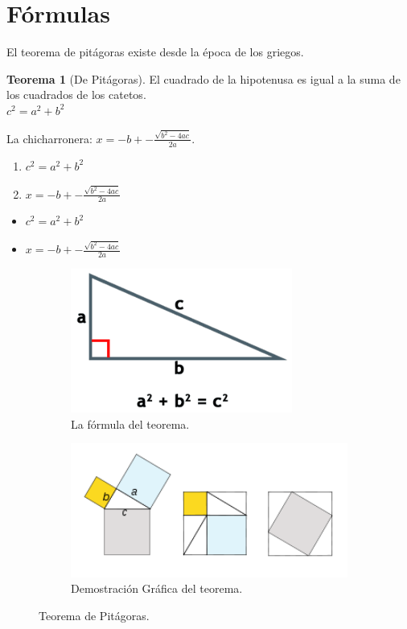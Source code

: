 \documentclass[oneside]{book}
\theoremstyle{definition}
\newtheorem{teorema}{Teorema}[chapter] %
\begin{document}
\section{Fórmulas}
El teorema de pitágoras existe desde la época de los griegos.

\begin{teorema}[De Pitágoras]
El cuadrado de la hipotenusa es igual a la suma de los cuadrados de los catetos.\\
$c^2 = a^2+b^2$
\end{teorema}

La chicharronera: $x= -b +-\frac{\sqrt{b^2-4ac}}{2a}$.

\begin{enumerate}
\item $c^2=a^2+b^2$
\item $x= -b +-\frac{\sqrt{b^2-4ac}}{2a}$
\end{enumerate}

\begin{itemize}
\item $c^2=a^2+b^2$
\item $x= -b +-\frac{\sqrt{b^2-4ac}}{2a}$ 
\end{itemize}

\begin{figure}[h]
  \centering
  \begin{subfigure}{0.45\textwidth}
    \includegraphics[width=0.8\textwidth]{pitagoras.png}
    \caption{La fórmula del teorema.}
    \label{fig:teo_pitagoras}
  \end{subfigure}
  \begin{subfigure}{0.45\textwidth}
    \includegraphics[width=1.0\textwidth]{pitagoras2.png}
    \caption{Demostración Gráfica del teorema.}
    \label{fig:grafica}
  \end{subfigure}
  \caption{Teorema de Pitágoras.}
\end{figure}
\end{document}
